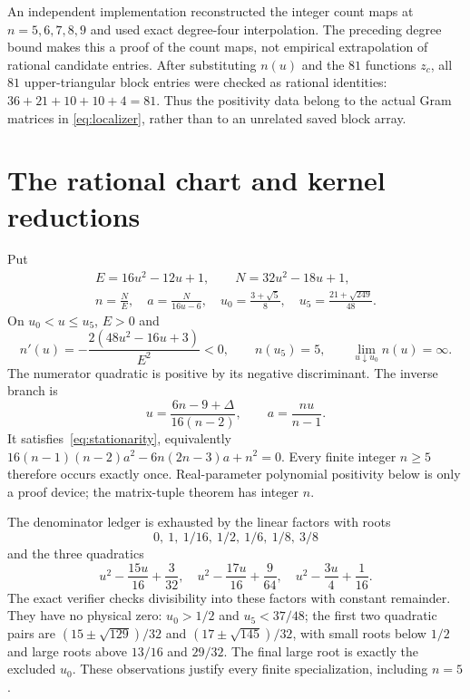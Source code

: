 \documentclass[11pt]{article}
\begin{document}
An independent implementation reconstructed the integer count maps at
$n=5,6,7,8,9$ and used exact degree-four interpolation. The preceding
degree bound makes this a proof of the count maps, not empirical
extrapolation of rational candidate entries. After substituting $n(u)$
and the $81$ functions $z_c$, all $81$ upper-triangular block entries
were checked as rational identities: $36+21+10+10+4=81$.
Thus the positivity data belong to the actual Gram matrices in
\eqref{eq:localizer}, rather than to an unrelated saved block array.

\section{The rational chart and kernel reductions}\label{sec:chart}
Put
\begin{equation}\label{eq:chart}
 \begin{gathered}
 E=16u^2-12u+1,\qquad N=32u^2-18u+1,\\
 n=\frac NE,\quad a=\frac N{16u-6},\quad
 u_0=\frac{3+\sqrt5}{8},\quad u_5=\frac{21+\sqrt{249}}{48}.
 \end{gathered}
\end{equation}
On $u_0<u\le u_5$, $E>0$ and
\[
 n'(u)=-\frac{2(48u^2-16u+3)}{E^2}<0,
 \qquad n(u_5)=5,\qquad \lim_{u\downarrow u_0}n(u)=\infty.
\]
The numerator quadratic is positive by its negative discriminant.
The inverse branch is
\[
 u=\frac{6n-9+\Delta}{16(n-2)},\qquad a=\frac{nu}{n-1}.
\]
It satisfies~\eqref{eq:stationarity}, equivalently
$16(n-1)(n-2)a^2-6n(2n-3)a+n^2=0$.
Every finite integer $n\ge5$ therefore occurs exactly once.
Real-parameter polynomial positivity below is only a proof device;
the matrix-tuple theorem has integer $n$.

The denominator ledger is exhausted by the linear factors with roots
\[
 0,\ 1,\ 1/16,\ 1/2,\ 1/6,\ 1/8,\ 3/8
\]
and the three quadratics
\begin{equation}\label{eq:denoms}
 u^2-\frac{15u}{16}+\frac3{32},\quad
 u^2-\frac{17u}{16}+\frac9{64},\quad
 u^2-\frac{3u}{4}+\frac1{16}.
\end{equation}
The exact verifier checks divisibility into these factors with constant
remainder. They have no physical zero: $u_0>1/2$ and $u_5<37/48$;
the first two quadratic pairs are
$(15\pm\sqrt{129})/32$ and $(17\pm\sqrt{145})/32$, with small roots
below $1/2$ and large roots above $13/16$ and $29/32$. The final large
root is exactly the excluded $u_0$. These observations justify every
finite specialization, including $n=5$.
\end{document}
